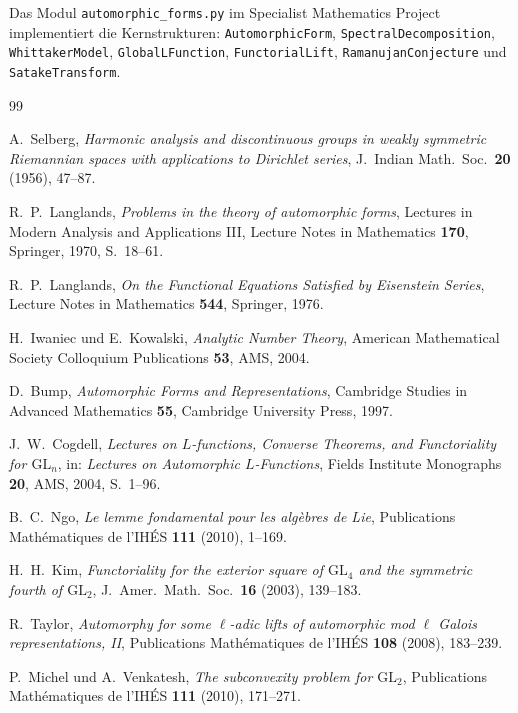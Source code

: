 \documentclass[12pt,a4paper]{amsart}
\theoremstyle{definition}
\newcommand{\GL}{\mathrm{GL}}
\begin{document}
Das Modul \texttt{automorphic\_forms.py} im Specialist Mathematics Project
implementiert die Kernstrukturen: \texttt{AutomorphicForm}, \texttt{SpectralDecomposition},
\texttt{WhittakerModel}, \texttt{GlobalLFunction}, \texttt{FunctorialLift},
\texttt{RamanujanConjecture} und \texttt{SatakeTransform}.

\begin{thebibliography}{99}

A.~Selberg,
\textit{Harmonic analysis and discontinuous groups in weakly symmetric Riemannian
spaces with applications to Dirichlet series},
J.~Indian Math.\ Soc.\ \textbf{20} (1956), 47--87.

R.~P.~Langlands,
\textit{Problems in the theory of automorphic forms},
Lectures in Modern Analysis and Applications III,
Lecture Notes in Mathematics \textbf{170}, Springer, 1970, S.~18--61.

R.~P.~Langlands,
\textit{On the Functional Equations Satisfied by Eisenstein Series},
Lecture Notes in Mathematics \textbf{544}, Springer, 1976.

H.~Iwaniec und E.~Kowalski,
\textit{Analytic Number Theory},
American Mathematical Society Colloquium Publications \textbf{53}, AMS, 2004.

D.~Bump,
\textit{Automorphic Forms and Representations},
Cambridge Studies in Advanced Mathematics \textbf{55}, Cambridge University Press, 1997.

J.~W.~Cogdell,
\textit{Lectures on $L$-functions, Converse Theorems, and Functoriality for $\GL_n$},
in: \textit{Lectures on Automorphic $L$-Functions},
Fields Institute Monographs \textbf{20}, AMS, 2004, S.~1--96.

B.~C.~Ngo,
\textit{Le lemme fondamental pour les algèbres de Lie},
Publications Mathématiques de l'IHÉS \textbf{111} (2010), 1--169.

H.~H.~Kim,
\textit{Functoriality for the exterior square of $\GL_4$ and the symmetric fourth of $\GL_2$},
J.~Amer.\ Math.\ Soc.\ \textbf{16} (2003), 139--183.

R.~Taylor,
\textit{Automorphy for some $\ell$-adic lifts of automorphic mod $\ell$ Galois representations, II},
Publications Mathématiques de l'IHÉS \textbf{108} (2008), 183--239.

P.~Michel und A.~Venkatesh,
\textit{The subconvexity problem for $\GL_2$},
Publications Mathématiques de l'IHÉS \textbf{111} (2010), 171--271.

\end{thebibliography}
\end{document}
